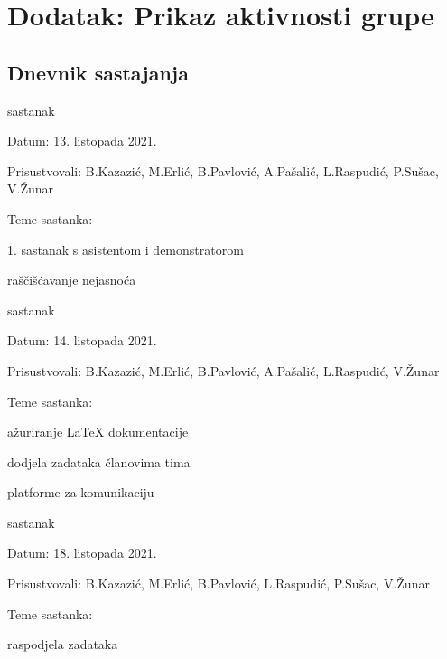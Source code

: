 \chapter*{Dodatak: Prikaz aktivnosti grupe}
		
		\section*{Dnevnik sastajanja}
		
		\begin{packed_enum}
			\item  sastanak
			
			\item[] \begin{packed_item}
				\item Datum: 13. listopada 2021.
				\item Prisustvovali: B.Kazazić, M.Erlić, B.Pavlović, A.Pašalić, L.Raspudić, P.Sušac, V.Žunar
				\item Teme sastanka:
				\begin{packed_item}
					\item 1. sastanak s asistentom i demonstratorom
					\item raščišćavanje nejasnoća
				\end{packed_item}
			\end{packed_item}
			
			\item  sastanak
			\item[] \begin{packed_item}
				\item Datum: 14. listopada 2021.
				\item Prisustvovali: B.Kazazić, M.Erlić, B.Pavlović, A.Pašalić, L.Raspudić, V.Žunar
				\item Teme sastanka:
				\begin{packed_item}
					\item ažuriranje LaTeX dokumentacije
					\item dodjela zadataka članovima tima
					\item platforme za komunikaciju
				\end{packed_item}
			\end{packed_item}
			
			\item  sastanak
			\item[] \begin{packed_item}
				\item Datum: 18. listopada 2021.
				\item Prisustvovali: B.Kazazić, M.Erlić, B.Pavlović, L.Raspudić, P.Sušac, V.Žunar
				\item Teme sastanka:
				\begin{packed_item}
					\item raspodjela zadataka
					\item 
					\item 
				\end{packed_item}
			\end{packed_item}
		

\end{packed_enum}
